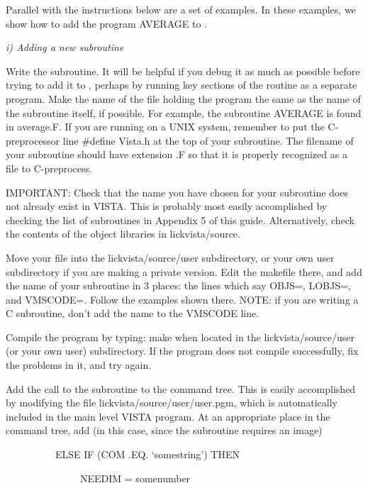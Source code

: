 	Parallel with the instructions below are a set of examples.
In these examples, we show how to add the program AVERAGE to \Vns.

\Sskip
\centerline {\it i) Adding a new subroutine\rm}

\vskip 0.125in
\hang
{}Write the subroutine.  It will be
helpful if you debug it as much as possible before trying to add it to
\Vns, perhaps by running key sections of the routine as a separate
program. Make the name of the file holding the program the same as the
name of the subroutine itself, if possible.  For example, the
subroutine AVERAGE is found in average.F.  If you are running on a 
UNIX system, remember to put the C-preprocessor line \#define Vista.h
at the top of your subroutine.  The filename of your subroutine should
have extension .F so that it is properly recognized as a file to C-preprocess.

\hang
{}IMPORTANT:  Check that the name you
have chosen for your subroutine does not already exist in VISTA. This
is probably most easily accomplished by checking the list of subroutines
in Appendix 5 of this guide. Alternatively, check the contents of the
object libraries in lickvista/source.

\hang
{} Move your file into the 
lickvista/source/user subdirectory, or your own user subdirectory if
you are making a private version. Edit the makefile there, and add the
name of your subroutine in 3 places: the lines which say OBJS=, LOBJS=,
and VMSCODE=.  Follow the examples shown there. NOTE: if you are writing
a C subroutine, don't add the name to the VMSCODE line.

\hang
{}Compile the program by typing: make
when located in the lickvista/source/user (or your own user) subdirectory.
If the program
does not compile successfully, fix the problems in it, and try again.

\hang
{}Add the call to the subroutine to the
command tree. This is easily accomplished by modifying the file
lickvista/source/user/user.pgm, which is automatically included in
the main level VISTA program. At an
appropriate place in the command tree, add (in this case, since the
subroutine requires an image)

\yyskip
	\ \ \ \ \ \ \ \ \ \ ELSE IF (COM .EQ. `somestring') THEN

	\ \ \ \ \ \ \ \ \ \ \ \ \ \ \ NEEDIM = somenumber

